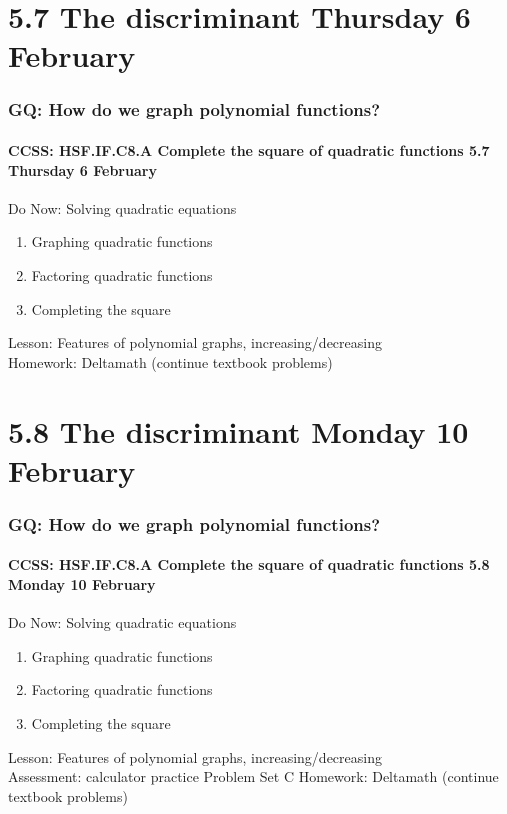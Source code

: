 \documentclass{beamer}
\begin{document}
\section{5.7 The discriminant \hfill Thursday 6 February}
\frame
{
  \frametitle{GQ: How do we graph polynomial functions?}
  \framesubtitle{CCSS: HSF.IF.C8.A Complete the square of quadratic functions \hfill \alert{5.7 Thursday 6 February}}

  \begin{block}{Do Now: Solving quadratic equations}
    \begin{enumerate}
      \item Graphing quadratic functions
      \item Factoring quadratic functions
      \item Completing the square
    \end{enumerate}
    \end{block}
    Lesson: Features of polynomial graphs, increasing/decreasing \\ \smallskip
    Homework: Deltamath (continue textbook problems)
    }

\section{5.8 The discriminant \hfill Monday 10 February}
\frame
{
  \frametitle{GQ: How do we graph polynomial functions?}
  \framesubtitle{CCSS: HSF.IF.C8.A Complete the square of quadratic functions \hfill \alert{5.8 Monday 10 February}}

  \begin{block}{Do Now: Solving quadratic equations}
    \begin{enumerate}
      \item Graphing quadratic functions
      \item Factoring quadratic functions
      \item Completing the square
    \end{enumerate}
    \end{block}
    Lesson: Features of polynomial graphs, increasing/decreasing \\ \smallskip
    Assessment: calculator practice Problem Set C
    Homework: Deltamath (continue textbook problems)
    }
\end{document}
